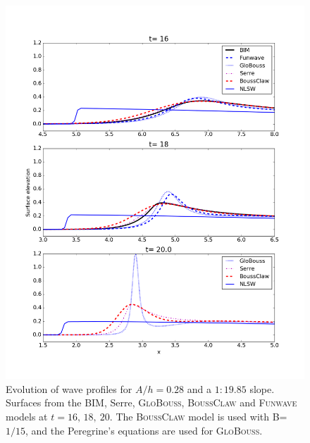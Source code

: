 \documentclass[review]{elsarticle}
\newcommand{\BoussClaw}{\textsc{BoussClaw} }
\begin{document}
\begin{figure}[tbh!]
\centering
\includegraphics[width=.9\textwidth]{_fig/bim_boussclaw_fun_glob.png}
\caption{Evolution of wave profiles for $A/h=0.28$ and a $1:19.85$ slope. 
Surfaces from the BIM, Serre, \textsc{GloBouss}, \BoussClaw
and \textsc{Funwave} models at $t = 16,\, 18,\ 20$.
The \BoussClaw model is used with B=$1/15$,
and the Peregrine's equations are used for \textsc{GloBouss}.}
\label{fig:bim_boussclaw_fun}
\end{figure}
\end{document}

